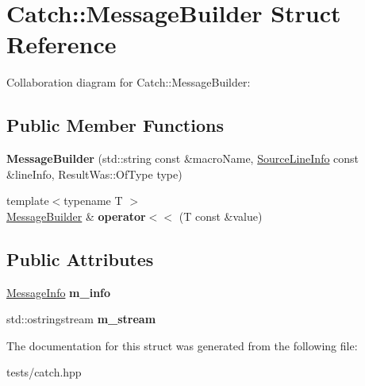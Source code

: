 \hypertarget{struct_catch_1_1_message_builder}{}\section{Catch\+:\+:Message\+Builder Struct Reference}
\label{struct_catch_1_1_message_builder}


Collaboration diagram for Catch\+:\+:Message\+Builder\+:
\subsection*{Public Member Functions}
\begin{DoxyCompactItemize}
\item 
\mbox{\label{struct_catch_1_1_message_builder_ab0c6378e722680bf58852c6ee2b6e724}} 
{\bfseries Message\+Builder} (std\+::string const \&macro\+Name, \hyperlink{struct_catch_1_1_source_line_info}{Source\+Line\+Info} const \&line\+Info, Result\+Was\+::\+Of\+Type type)
\item 
\mbox{\label{struct_catch_1_1_message_builder_a20fa48d069b20dddcc2d3df8abb123c1}} 
{\footnotesize template$<$typename T $>$ }\\\hyperlink{struct_catch_1_1_message_builder}{Message\+Builder} \& {\bfseries operator$<$$<$} (T const \&value)
\end{DoxyCompactItemize}
\subsection*{Public Attributes}
\begin{DoxyCompactItemize}
\item 
\mbox{\label{struct_catch_1_1_message_builder_a979f1c2b36d78f80ee275bfa5ba0209f}} 
\hyperlink{struct_catch_1_1_message_info}{Message\+Info} {\bfseries m\+\_\+info}
\item 
\mbox{\label{struct_catch_1_1_message_builder_a6488ab0cc4ea52affc9c0612c7c5df6b}} 
std\+::ostringstream {\bfseries m\+\_\+stream}
\end{DoxyCompactItemize}


The documentation for this struct was generated from the following file\+:\begin{DoxyCompactItemize}
\item 
tests/catch.\+hpp\end{DoxyCompactItemize}
